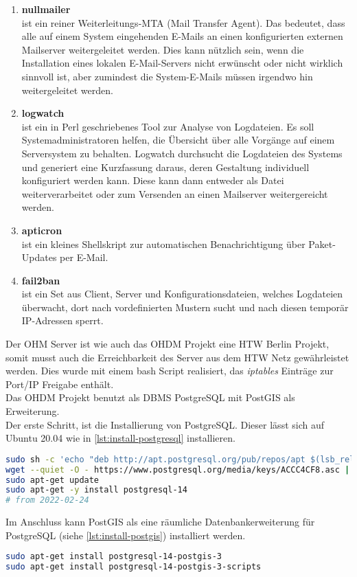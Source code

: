 \begin{enumerate}[label=\textbf{\arabic*.}]
	\item \textbf{nullmailer}\\ist ein reiner Weiterleitungs-MTA (Mail Transfer Agent). Das bedeutet, dass alle auf einem System eingehenden E-Mails an einen konfigurierten externen Mailserver weitergeleitet werden. Dies kann nützlich sein, wenn die Installation eines lokalen E-Mail-Servers nicht erwünscht oder nicht wirklich sinnvoll ist, aber zumindest die System-E-Mails müssen irgendwo hin weitergeleitet werden.
	\item \textbf{logwatch}\\ist ein in Perl geschriebenes Tool zur Analyse von Logdateien. Es soll Systemadministratoren helfen, die Übersicht über alle Vorgänge auf einem Serversystem zu behalten. Logwatch durchsucht die Logdateien des Systems und generiert eine Kurzfassung daraus, deren Gestaltung individuell konfiguriert werden kann. Diese kann dann entweder als Datei weiterverarbeitet oder zum Versenden an einen Mailserver weitergereicht werden.
	\item \textbf{apticron}\\ist ein kleines Shellskript zur automatischen Benachrichtigung über Paket-Updates per E-Mail.
	\item \textbf{fail2ban}\\ist ein Set aus Client, Server und Konfigurationsdateien, welches Logdateien überwacht, dort nach vordefinierten Mustern sucht und nach diesen temporär IP-Adressen sperrt.
\end{enumerate}\vspace{1cm}

Der OHM Server ist wie auch das \ac{OHDM} Projekt eine HTW Berlin Projekt, somit musst auch die Erreichbarkeit des Server aus dem HTW Netz gewährleistet werden. Dies wurde mit einem bash Script realisiert, das \textit{iptables} Einträge zur Port/IP Freigabe enthält.\\

Das \ac{OHDM} Projekt benutzt als \ac{DBMS} PostgreSQL mit PostGIS als Erweiterung.\\
Der erste Schritt, ist die Installierung von PostgreSQL. Dieser lässt sich auf Ubuntu 20.04 wie in \autoref{lst:install-postgresql} installieren.
\begin{lstlisting}[language=bash,caption={Installation PostgreSQL},label={lst:install-postgresql}]
sudo sh -c 'echo "deb http://apt.postgresql.org/pub/repos/apt $(lsb_release -cs)-pgdg main" > /etc/apt/sources.list.d/pgdg.list'
wget --quiet -O - https://www.postgresql.org/media/keys/ACCC4CF8.asc | sudo apt-key add -
sudo apt-get update
sudo apt-get -y install postgresql-14
# from 2022-02-24
\end{lstlisting}
Im Anschluss kann PostGIS als eine räumliche Datenbankerweiterung für PostgreSQL (siehe \autoref{lst:install-postgis}) installiert werden.
\begin{lstlisting}[language=bash,caption={Installation PostGIS},label={lst:install-postgis}]
sudo apt-get install postgresql-14-postgis-3
sudo apt-get install postgresql-14-postgis-3-scripts
\end{lstlisting}

